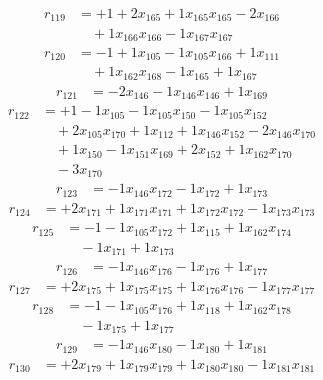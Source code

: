 \[\begin{aligned}
r_{119} &= + 1 + 2 x_{165} + 1 x_{165} x_{165} - 2 x_{166} \\
 &\quad + 1 x_{166} x_{166} - 1 x_{167} x_{167}
\end{aligned}\]
\[\begin{aligned}
r_{120} &= - 1 + 1 x_{105} - 1 x_{105} x_{166} + 1 x_{111} \\
 &\quad + 1 x_{162} x_{168} - 1 x_{165} + 1 x_{167}
\end{aligned}\]
\[\begin{aligned}
r_{121} &= - 2 x_{146} - 1 x_{146} x_{146} + 1 x_{169}
\end{aligned}\]
\[\begin{aligned}
r_{122} &= + 1 - 1 x_{105} - 1 x_{105} x_{150} - 1 x_{105} x_{152} \\
 &\quad + 2 x_{105} x_{170} + 1 x_{112} + 1 x_{146} x_{152} - 2 x_{146} x_{170} \\
 &\quad + 1 x_{150} - 1 x_{151} x_{169} + 2 x_{152} + 1 x_{162} x_{170} \\
 &\quad - 3 x_{170}
\end{aligned}\]
\[\begin{aligned}
r_{123} &= - 1 x_{146} x_{172} - 1 x_{172} + 1 x_{173}
\end{aligned}\]
\[\begin{aligned}
r_{124} &= + 2 x_{171} + 1 x_{171} x_{171} + 1 x_{172} x_{172} - 1 x_{173} x_{173}
\end{aligned}\]
\[\begin{aligned}
r_{125} &= - 1 - 1 x_{105} x_{172} + 1 x_{115} + 1 x_{162} x_{174} \\
 &\quad - 1 x_{171} + 1 x_{173}
\end{aligned}\]
\[\begin{aligned}
r_{126} &= - 1 x_{146} x_{176} - 1 x_{176} + 1 x_{177}
\end{aligned}\]
\[\begin{aligned}
r_{127} &= + 2 x_{175} + 1 x_{175} x_{175} + 1 x_{176} x_{176} - 1 x_{177} x_{177}
\end{aligned}\]
\[\begin{aligned}
r_{128} &= - 1 - 1 x_{105} x_{176} + 1 x_{118} + 1 x_{162} x_{178} \\
 &\quad - 1 x_{175} + 1 x_{177}
\end{aligned}\]
\[\begin{aligned}
r_{129} &= - 1 x_{146} x_{180} - 1 x_{180} + 1 x_{181}
\end{aligned}\]
\[\begin{aligned}
r_{130} &= + 2 x_{179} + 1 x_{179} x_{179} + 1 x_{180} x_{180} - 1 x_{181} x_{181}
\end{aligned}\]
